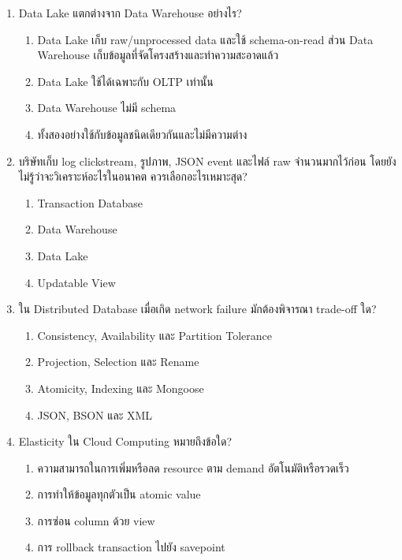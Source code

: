 \documentclass[a4paper,12pt]{article}
\begin{document}
\begin{enumerate}[label=\textbf{\arabic*.}]
    \item Data Lake แตกต่างจาก Data Warehouse อย่างไร?
    \begin{enumerate}[label=\alph*.]
        \item Data Lake เก็บ raw/unprocessed data และใช้ schema-on-read ส่วน Data Warehouse เก็บข้อมูลที่จัดโครงสร้างและทำความสะอาดแล้ว
        \item Data Lake ใช้ได้เฉพาะกับ OLTP เท่านั้น
        \item Data Warehouse ไม่มี schema
        \item ทั้งสองอย่างใช้กับข้อมูลชนิดเดียวกันและไม่มีความต่าง
    \end{enumerate}

    \item บริษัทเก็บ log clickstream, รูปภาพ, JSON event และไฟล์ raw จำนวนมากไว้ก่อน โดยยังไม่รู้ว่าจะวิเคราะห์อะไรในอนาคต ควรเลือกอะไรเหมาะสุด?
    \begin{enumerate}[label=\alph*.]
        \item Transaction Database
        \item Data Warehouse
        \item Data Lake
        \item Updatable View
    \end{enumerate}

    \item ใน Distributed Database เมื่อเกิด network failure มักต้องพิจารณา trade-off ใด?
    \begin{enumerate}[label=\alph*.]
        \item Consistency, Availability และ Partition Tolerance
        \item Projection, Selection และ Rename
        \item Atomicity, Indexing และ Mongoose
        \item JSON, BSON และ XML
    \end{enumerate}

    \item Elasticity ใน Cloud Computing หมายถึงข้อใด?
    \begin{enumerate}[label=\alph*.]
        \item ความสามารถในการเพิ่มหรือลด resource ตาม demand อัตโนมัติหรือรวดเร็ว
        \item การทำให้ข้อมูลทุกตัวเป็น atomic value
        \item การซ่อน column ด้วย view
        \item การ rollback transaction ไปยัง savepoint
    \end{enumerate}
\end{enumerate}
\end{document}
